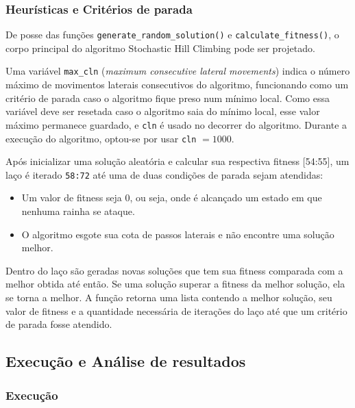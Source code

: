 

\subsubsection{Heurísticas e Critérios de parada}

De posse das funções \verb*|generate_random_solution()| e \verb*|calculate_fitness()|, o corpo principal do algoritmo Stochastic Hill Climbing pode ser projetado.

Uma variável \verb*|max_cln| (\textit{maximum consecutive lateral movements}) indica o número máximo de movimentos laterais consecutivos do algoritmo, funcionando como um critério de parada caso o algoritmo fique preso num mínimo local. Como essa variável deve ser resetada caso o algoritmo saia do mínimo local, esse valor máximo permanece guardado, e \verb*|cln| é usado no decorrer do algoritmo. Durante a execução do algoritmo, optou-se por usar \verb*|cln| $=1000$.

Após inicializar uma solução aleatória e calcular sua respectiva fitness [54:55], um laço é iterado \verb*|58:72| até uma de duas condições de parada sejam atendidas:
\begin{itemize}
	\item Um valor de fitness seja 0, ou seja, onde é alcançado um estado em que nenhuma rainha se ataque.
	\item O algoritmo esgote sua cota de passos laterais e não encontre uma solução melhor.
\end{itemize}

Dentro do laço são geradas novas soluções que tem sua fitness comparada com a melhor obtida até então. Se uma solução superar a fitness da melhor solução, ela se torna a melhor. A função retorna uma lista contendo a melhor solução, seu valor de fitness e a quantidade necessária de iterações do laço até que um critério de parada fosse atendido. 



\subsection{Execução e Análise de resultados}

\subsubsection{Execução}

